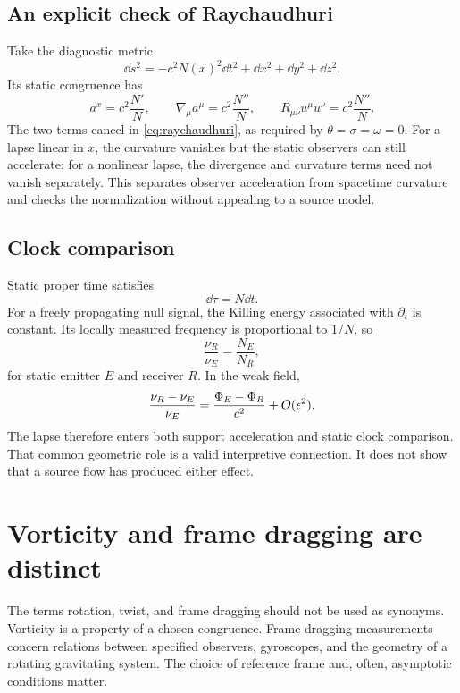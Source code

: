 \documentclass[11pt]{article}
\begin{document}
\subsection{An explicit check of Raychaudhuri}
Take the diagnostic metric
\begin{equation}
\dd s^2=-c^2N(x)^2\dd t^2+\dd x^2+\dd y^2+\dd z^2.
\end{equation}
Its static congruence has
\begin{equation}
a^x=c^2\frac{N'}{N},\qquad
\nabla_\mu a^\mu=c^2\frac{N''}{N},\qquad
R_{\mu\nu}u^\mu u^\nu=c^2\frac{N''}{N}.
\end{equation}
The two terms cancel in \eqref{eq:raychaudhuri}, as required by $\theta=\sigma=\omega=0$. For a lapse linear in $x$, the curvature vanishes but the static observers can still accelerate; for a nonlinear lapse, the divergence and curvature terms need not vanish separately. This separates observer acceleration from spacetime curvature and checks the normalization without appealing to a source model.

\subsection{Clock comparison}
Static proper time satisfies
\begin{equation}
\dd\tau=N\dd t.
\label{eq:stationarytime}
\end{equation}
For a freely propagating null signal, the Killing energy associated with $\partial_t$ is constant. Its locally measured frequency is proportional to $1/N$, so
\begin{equation}
\frac{\nu_R}{\nu_E}=\frac{N_E}{N_R},
\label{eq:redshift}
\end{equation}
for static emitter $E$ and receiver $R$. In the weak field,
\begin{equation}
\frac{\nu_R-\nu_E}{\nu_E}=\frac{\Phi_E-\Phi_R}{c^2}+O(\epsilon^2).
\label{eq:redshiftweakfield}
\end{equation}
The lapse therefore enters both support acceleration and static clock comparison. That common geometric role is a valid interpretive connection. It does not show that a source flow has produced either effect.

\section{Vorticity and frame dragging are distinct}
The terms rotation, twist, and frame dragging should not be used as synonyms. Vorticity is a property of a chosen congruence. Frame-dragging measurements concern relations between specified observers, gyroscopes, and the geometry of a rotating gravitating system. The choice of reference frame and, often, asymptotic conditions matter.
\end{document}
